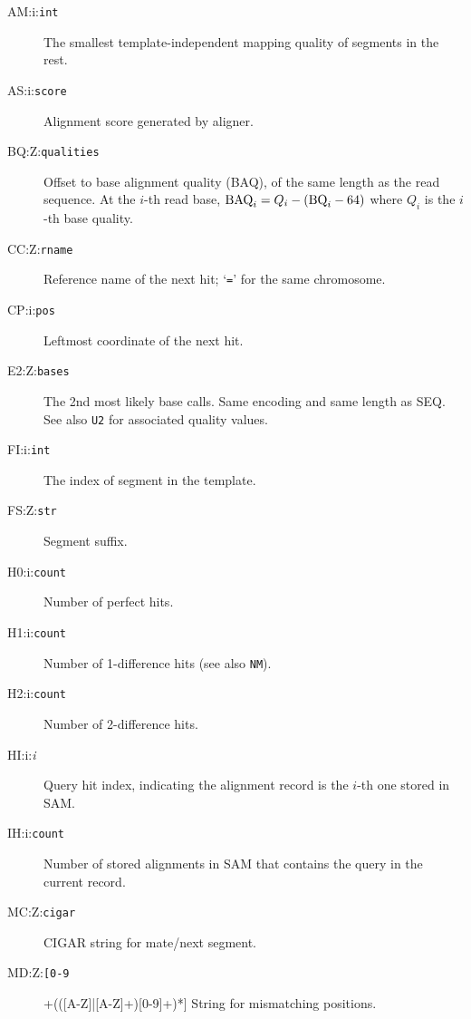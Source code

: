 \documentclass[10pt]{article}
\newcommand{\tagvalue}[1]{\tt #1}
\newcommand{\tagregex}[1]{\tt #1}
\begin{document}
\begin{description}
\item[AM:i:\tagvalue{int}]
The smallest template-independent mapping quality of segments in the rest.

\item[AS:i:\tagvalue{score}]
Alignment score generated by aligner.

\item[BQ:Z:\tagvalue{qualities}]
Offset to base alignment quality (BAQ), of the same length as the read sequence.
At the $i$-th read base, ${\rm BAQ}_i=Q_i-({\rm BQ}_i-64)$ where $Q_i$ is the $i$-th base quality.

\item[CC:Z:\tagvalue{rname}]
Reference name of the next hit; `{\tt =}' for the same chromosome.

\item[CP:i:\tagvalue{pos}]
Leftmost coordinate of the next hit.

\item[E2:Z:\tagvalue{bases}]
The 2nd most likely base calls. Same encoding and same length as {\sf SEQ}.
See also {\tt U2} for associated quality values.

\item[FI:i:\tagvalue{int}]
The index of segment in the template.

\item[FS:Z:\tagvalue{str}]
Segment suffix.

\item[H0:i:\tagvalue{count}]
Number of perfect hits.

\item[H1:i:\tagvalue{count}]
Number of 1-difference hits (see also {\tt NM}).

\item[H2:i:\tagvalue{count}]
Number of 2-difference hits.

\item[HI:i:\emph{i}]
Query hit index, indicating the alignment record is the $i$-th one stored
in SAM.

\item[IH:i:\tagvalue{count}]
Number of stored alignments in SAM that contains the query in the current
record.

\item[MC:Z:\tagvalue{cigar}]
CIGAR string for mate/next segment.

\item[MD:Z:\tagregex{[0-9]+(([A-Z]|[A-Z]+)[0-9]+)*}]
String for mismatching positions.


\end{description}
\end{document}
